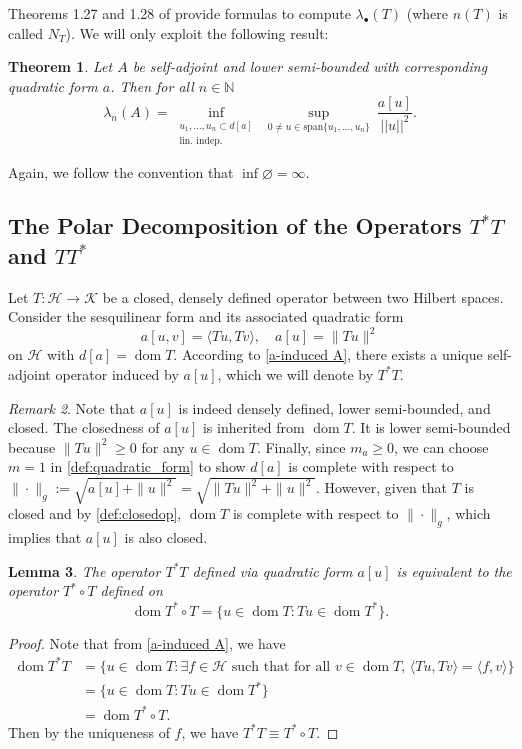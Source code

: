 \documentclass[11pt]{article}
\newtheorem{theorem}{Theorem}[section]
\newtheorem{lemma}[theorem]{Lemma}
\theoremstyle{definition}
\theoremstyle{remark}
\newtheorem{remark}[theorem]{Remark}
\DeclareMathOperator\dom{dom}
\newcommand{\N}{\mathbb{N}}
\begin{document}
Theorems 1.27 and 1.28 of \citet{schroedingerop} provide formulas to compute $\lambda_\bullet(T)$ (where $n(T)$ is called $N_T$). We will only exploit the following result:

\begin{theorem}\textnormal{\citep[Theorem 1.28]{schroedingerop}}
    Let $A$ be self-adjoint and lower semi-bounded with corresponding quadratic form $a$. Then for all $n \in \N$ \label{thm:ari1.28}
    $$
        \lambda_n(A) = \inf_{\substack{u_1,\dots,u_n \subset d[a] \\ \text{lin.~indep.}}} \ \sup_{0 \not= u \in \text{span}\{u_1,\dots,u_n\} } \ \frac{a[u]}{||u||^2}.
    $$
\end{theorem}
Again, we follow the convention that $\inf\varnothing=\infty$.

\subsection{The Polar Decomposition of the Operators $T^*T$ and $TT^*$}
Let $T:\mathcal{H}\to \mathcal{K}$ be a closed, densely defined operator between two Hilbert spaces. Consider the sesquilinear form and its associated quadratic form
$$a[u,v]=\langle Tu,Tv\rangle,\quad a[u]=\|Tu\|^2$$
on $\mathcal{H}$ with $d[a]=\dom T$. According to \cref{a-induced A}, there exists a unique self-adjoint operator induced by $a[u]$, which we will denote by $T^*T$.

\begin{remark}\label{remark:T*T}
    Note that $a[u]$ is indeed densely defined, lower semi-bounded, and closed. The closedness of $a[u]$ is inherited from $\dom T$. It is lower semi-bounded because $\|Tu\|^2\geq 0$ for any $u\in\dom T$. Finally, since $m_a\geq0$, we can choose $m=1$ in \cref{def:quadratic_form} to show $d[a]$ is complete with respect to $\|\cdot\|_g:=\sqrt{a[u]+\|u\|^2}=\sqrt{\|Tu\|^2+\|u\|^2}$. However, given that $T$ is closed and by \cref{def:closedop}, $\dom T$ is complete with respect to $\|\cdot\|_g$, which implies that $a[u]$ is also closed.
\end{remark}

\begin{lemma}\label{lm:equivalence of T^*T}
    The operator $T^*T$ defined via quadratic form $a[u]$ is equivalent to the operator $T^*\circ T$ defined on
    $$\dom T^*\circ T=\{u\in\dom T:Tu\in\dom T^*\}.$$
\end{lemma}
\begin{proof}
    Note that from \cref{a-induced A}, we have
    \begin{align*}
        \dom T^*T&=\{u\in \dom T:\text{$\exists f\in\mathcal{H}$ such that for all $v\in \dom T,\, \langle Tu, Tv\rangle=\langle f,v\rangle$}\}\\
        &=\{u\in \dom T:Tu\in \dom T^*\}\\
        &=\dom T^*\circ T.
    \end{align*}
    Then by the uniqueness of $f$, we have $T^*T\equiv T^*\circ T$.
\end{proof}
\end{document}
